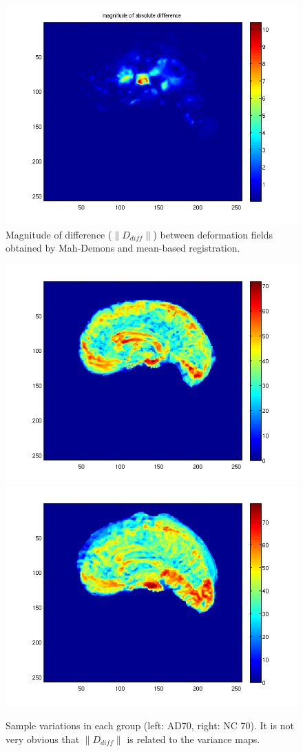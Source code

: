 \documentclass[preprint,review,12pt]{elsarticle}
\begin{document}
\begin{figure}[h!!!!!!!!!!!!tb]
\begin{center}
	\includegraphics[width=.8\linewidth]{figs/deform_diff.png}
\end{center}
\caption{Magnitude of difference ($\|D_{diff}\|$) between deformation fields obtained by Mah-Demons and mean-based registration.}
\label{fig:deform_difference}
\end{figure}


\begin{figure}[h!!!!!!!!!!!!tb]
\begin{center}
	\includegraphics[width=.45\linewidth]{figs/fixed_var.png}
	\includegraphics[width=.45\linewidth]{figs/moving_var.png}
\end{center}
\caption{Sample variations in each group (left: AD70, right: NC 70). It is not very obvious that $\|D_{diff}\|$ is related to the variance maps. }
\label{fig:group_var}
\end{figure}
\end{document}
